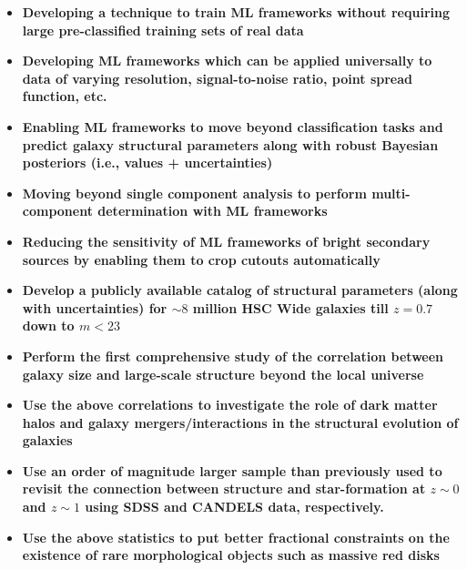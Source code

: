 \begin{tcolorbox}[breakable,colback=blue!5!white,colframe=blue!75!black,title=\textbf{Key Technical Goals}]
\begin{itemize}
 \setlength\itemsep{-0.1em}
\item \textbf{Developing a technique to train ML frameworks without requiring large pre-classified training sets of real data}
\item \textbf{Developing ML frameworks which can be applied universally to data of varying resolution, signal-to-noise ratio, point spread function, etc.}
\item \textbf{Enabling ML frameworks to move beyond classification tasks and predict galaxy structural parameters along with robust Bayesian posteriors (i.e., values + uncertainties)}
\item \textbf{Moving beyond single component analysis to perform multi-component determination with ML frameworks}
\item \textbf{Reducing the sensitivity of ML frameworks of bright secondary sources by enabling them to crop cutouts automatically}
\end{itemize}
\end{tcolorbox}

\begin{tcolorbox}[breakable,colback=blue!5!white,colframe=blue!75!black,title=\textbf{Key Science Goals}]
\begin{itemize}
 \setlength\itemsep{-0.1em}
\item \textbf{Develop a publicly available catalog of structural parameters (along with uncertainties) for $\sim8$ million HSC Wide galaxies till $z=0.7$ down to $m < 23$}
\end{itemize}
\tcblower
\begin{itemize}
\setlength\itemsep{-0.1em}
\item \textbf{Perform the first comprehensive study of the correlation between galaxy size and large-scale structure beyond the local universe}
\item \textbf{Use the above correlations to investigate the role of dark matter halos and galaxy mergers/interactions in the structural evolution of galaxies}
\end{itemize}
\vspace{-0.25in}
\DrawLine
\vspace{-0.15in}
\begin{itemize}
\setlength\itemsep{-0.1em}
\item \textbf{Use an order of magnitude larger sample than previously used to revisit the connection between structure and star-formation at $z\sim0$ and $z\sim1$ using SDSS and CANDELS data, respectively.}
\item \textbf{Use the above statistics to put better fractional constraints on the existence of rare morphological objects such as massive red disks}
\end{itemize}
\end{tcolorbox}

